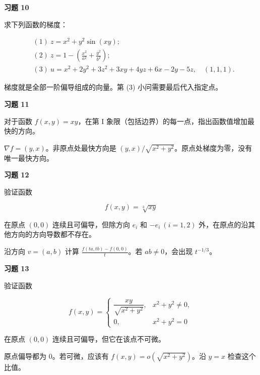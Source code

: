 \begin{exercisebox}
\textbf{习题 10}

求下列函数的梯度：

\[
      \begin{aligned}
      &(1)\ z=x^2+y^2\sin(xy);\\
      &(2)\ z=1-\left(\frac{x^2}{a^2}+\frac{y^2}{b^2}\right);\\
      &(3)\ u=x^2+2y^2+3z^2+3xy+4yz+6x-2y-5z,\quad (1,1,1).
      \end{aligned}
      \]

\begin{hintbox}
梯度就是全部一阶偏导组成的向量。第 (3) 小问需要最后代入指定点。
\end{hintbox}
\end{exercisebox}

\begin{exercisebox}
\textbf{习题 11}

对于函数 \(f(x,y)=xy\)，在第 I 象限（包括边界）的每一点，指出函数值增加最快的方向。

\begin{hintbox}
\(\nabla f=(y,x)\)。非原点处最快方向是 \((y,x)/\sqrt{x^2+y^2}\)。原点处梯度为零，没有唯一最快方向。
\end{hintbox}
\end{exercisebox}

\begin{exercisebox}
\textbf{习题 12}

验证函数

\[
        f(x,y)=\sqrt[3]{xy}
      \]

在原点 \((0,0)\) 连续且可偏导，但除方向 \(e_i\) 和 \(-e_i\ (i=1,2)\) 外，在原点的沿其他方向的方向导数都不存在。

\begin{hintbox}
沿方向 \(v=(a,b)\) 计算 \(\frac{f(ta,tb)-f(0,0)}{t}\)。若 \(ab\ne0\)，会出现 \(t^{-1/3}\)。
\end{hintbox}
\end{exercisebox}

\begin{exercisebox}
\textbf{习题 13}

验证函数

\[
      f(x,y)=
      \begin{cases}
      \dfrac{xy}{\sqrt{x^2+y^2}}, & x^2+y^2\ne0,\\
      0, & x^2+y^2=0
      \end{cases}
      \]

在原点 \((0,0)\) 连续且可偏导，但它在该点不可微。

\begin{hintbox}
原点偏导都为 \(0\)。若可微，应该有 \(f(x,y)=o(\sqrt{x^2+y^2})\)。沿 \(y=x\) 检查这个比值。
\end{hintbox}
\end{exercisebox}

